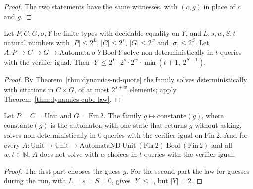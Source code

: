 \begin{proof}
  \leanok
  The two statements have the same witnesses, with $(c, g)$ in place of $c$ and $g$.
\end{proof}

\begin{theorem}
  \label{thm:dynamics-nd-law}
  \leanok
  Let $P, C, G, \sigma, Y$ be finite types with decidable equality on $Y$, and $L, s, w, S, t$
  natural numbers with $|P| \le 2^L$, $|C| \le 2^s$, $|G| \le 2^w$ and $|\sigma| \le 2^S$. Let
  $A : P \to C \to G \to \mathrm{Automata}\ \sigma\ Y\ \mathrm{Bool}\ Y$ solve non-deterministically
  in $t$ queries with the verifier $\mathrm{igual}$. Then
  $|Y| \le 2^L \cdot 2^s \cdot 2^w \cdot \min(t+1,\ 2^{S-1})$.
  \own{}
\end{theorem}

\begin{proof}
  \leanok
  By Theorem~\ref{thm:dynamics-nd-quote} the family solves deterministically with citations in
  $C \times G$, of at most $2^{s+w}$ elements; apply Theorem~\ref{thm:dynamics-cube-law}.
\end{proof}

\begin{proposition}
  \label{prop:dynamics-run-less-than-start}
  \leanok
  Let $P = C = \mathrm{Unit}$ and $G = \mathrm{Fin}\ 2$. The family
  $g \mapsto \mathrm{constante}(g)$, where $\mathrm{constante}(g)$ is the automaton with one state
  that returns $g$ without asking, solves non-deterministically in $0$ queries with the verifier
  $\mathrm{igual}$ on $\mathrm{Fin}\ 2$. And for every
  $A : \mathrm{Unit} \to \mathrm{Unit} \to \mathrm{AutomataND}\ \mathrm{Unit}\ (\mathrm{Fin}\ 2)\
  \mathrm{Bool}\ (\mathrm{Fin}\ 2)$ and all $w, t \in \mathbb{N}$, $A$ does not solve with $w$
  choices in $t$ queries with the verifier $\mathrm{igual}$.
  \own{}
\end{proposition}

\begin{proof}
  \leanok
  The first part chooses the guess $y$. For the second part the law for guesses during the run,
  with $L = s = S = 0$, gives $|Y| \le 1$, but $|Y| = 2$.
\end{proof}


